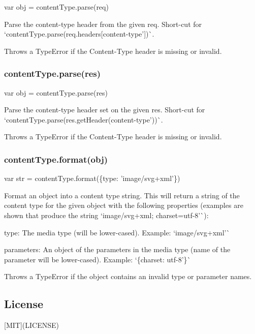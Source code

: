\begin{DoxyCode}
var obj = contentType.parse(req)
\end{DoxyCode}


Parse the {\ttfamily content-\/type} header from the given {\ttfamily req}. Short-\/cut for `content\+Type.\+parse(req.\+headers\mbox{[}\textquotesingle{}content-\/type'\mbox{]})\`{}.

Throws a {\ttfamily Type\+Error} if the {\ttfamily Content-\/\+Type} header is missing or invalid.

\subsubsection*{content\+Type.\+parse(res)}


\begin{DoxyCode}
var obj = contentType.parse(res)
\end{DoxyCode}


Parse the {\ttfamily content-\/type} header set on the given {\ttfamily res}. Short-\/cut for `content\+Type.\+parse(res.\+get\+Header(\textquotesingle{}content-\/type'))\`{}.

Throws a {\ttfamily Type\+Error} if the {\ttfamily Content-\/\+Type} header is missing or invalid.

\subsubsection*{content\+Type.\+format(obj)}


\begin{DoxyCode}
var str = contentType.format(\{type: 'image/svg+xml'\})
\end{DoxyCode}


Format an object into a content type string. This will return a string of the content type for the given object with the following properties (examples are shown that produce the string `\textquotesingle{}image/svg+xml; charset=utf-\/8'\`{})\+:


\begin{DoxyItemize}
\item {\ttfamily type}\+: The media type (will be lower-\/cased). Example\+: `\textquotesingle{}image/svg+xml'\`{}
\item {\ttfamily parameters}\+: An object of the parameters in the media type (name of the parameter will be lower-\/cased). Example\+: `\{charset\+: \textquotesingle{}utf-\/8'\}\`{}
\end{DoxyItemize}

Throws a {\ttfamily Type\+Error} if the object contains an invalid type or parameter names.

\subsection*{License}

\mbox{[}M\+IT\mbox{]}(L\+I\+C\+E\+N\+SE) 